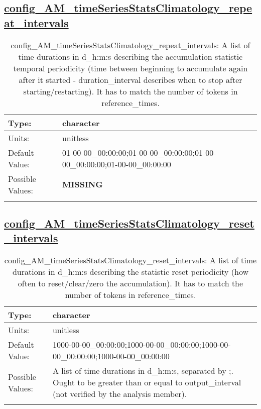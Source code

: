 \subsection[config\_AM\_timeSeriesStatsClimatology\_repeat\_intervals]{\hyperref[sec:nm_tab_AM_timeSeriesStatsClimatology]{config\_AM\_timeSeriesStatsClimatology\_repeat\_intervals}}
\label{subsec:nm_sec_config_AM_timeSeriesStatsClimatology_repeat_intervals}
\begin{center}
\begin{longtable}{| p{2.0in} || p{4.0in} |}
    \hline
    Type: & character \\
    \hline
    Units: & \si{unitless} \\
    \hline
    Default Value: & 01-00-00\_00:00:00;01-00-00\_00:00:00;01-00-00\_00:00:00;01-00-00\_00:00:00 \\
    \hline
    Possible Values: & {\bf \color{red} MISSING} \\
    \hline
    \caption{config\_AM\_timeSeriesStatsClimatology\_repeat\_intervals: A list of time durations in d\_h:m:s describing the accumulation statistic temporal periodicity (time between beginning to accumulate again after it started - duration\_interval describes when to stop after starting/restarting). It has to match the number of tokens in reference\_times.}
\end{longtable}
\end{center}
\subsection[config\_AM\_timeSeriesStatsClimatology\_reset\_intervals]{\hyperref[sec:nm_tab_AM_timeSeriesStatsClimatology]{config\_AM\_timeSeriesStatsClimatology\_reset\_intervals}}
\label{subsec:nm_sec_config_AM_timeSeriesStatsClimatology_reset_intervals}
\begin{center}
\begin{longtable}{| p{2.0in} || p{4.0in} |}
    \hline
    Type: & character \\
    \hline
    Units: & \si{unitless} \\
    \hline
    Default Value: & 1000-00-00\_00:00:00;1000-00-00\_00:00:00;1000-00-00\_00:00:00;1000-00-00\_00:00:00 \\
    \hline
    Possible Values: & A list of time durations in d\_h:m:s, separated by ;. Ought to be greater than or equal to output\_interval (not verified by the analysis member). \\
    \hline
    \caption{config\_AM\_timeSeriesStatsClimatology\_reset\_intervals: A list of time durations in d\_h:m:s describing the statistic reset periodicity (how often to reset/clear/zero the accumulation). It has to match the number of tokens in reference\_times.}
\end{longtable}
\end{center}
